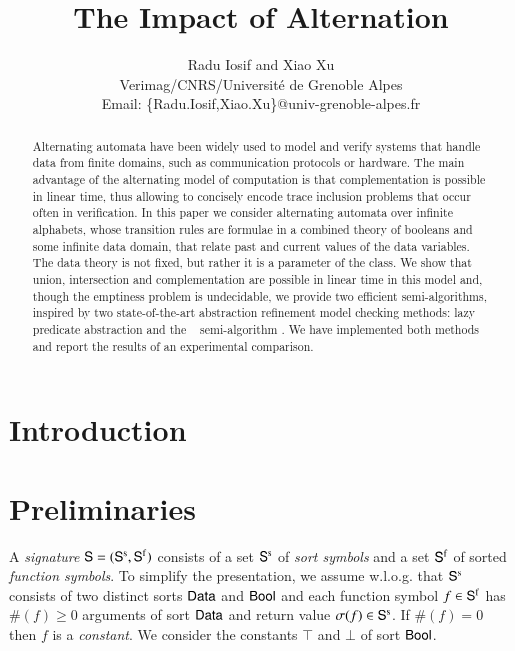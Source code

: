 \documentclass[10pt,conference,letterpaper,twocolumn]{IEEEtran}
\begin{document}

\title{The Impact of Alternation}

\author{Radu Iosif and Xiao Xu \\
Verimag/CNRS/Universit\'e de Grenoble Alpes\\
Email: \{Radu.Iosif,Xiao.Xu\}@univ-grenoble-alpes.fr}

\maketitle

\begin{abstract}
Alternating automata have been widely used to model and verify systems
that handle data from finite domains, such as communication protocols
or hardware. The main advantage of the alternating model of
computation is that complementation is possible in linear time, thus
allowing to concisely encode trace inclusion problems that occur often
in verification. In this paper we consider alternating automata over
infinite alphabets, whose transition rules are formulae in a combined
theory of booleans and some infinite data domain, that relate past and
current values of the data variables. The data theory is not fixed,
but rather it is a parameter of the class. We show that union,
intersection and complementation are possible in linear time in this
model and, though the emptiness problem is undecidable, we provide two
efficient semi-algorithms, inspired by two state-of-the-art
abstraction refinement model checking methods: lazy predicate
abstraction \cite{HJMS02} and the \impact~ semi-algorithm
\cite{mcmillan06}. We have implemented both methods and report the
results of an experimental comparison.
\end{abstract}

\section{Introduction}

\section{Preliminaries}

A \emph{signature} $\mathsf{S} = (\mathsf{S}^\mathrm{s},\mathsf{S}^\mathrm{f})$ consists of a
set $\mathsf{S}^\mathrm{s}$ of \emph{sort symbols} and a set $\mathsf{S}^\mathrm{f}$ of
sorted \emph{function symbols}. To simplify the presentation, we
assume w.l.o.g. that $\mathsf{S}^\mathrm{s}$ consists of two distinct sorts
$\mathsf{Data}$ and $\mathsf{Bool}$ and each function symbol $f \in \mathsf{S}^\mathrm{f}$ has
$\#(f) \geq 0$ arguments of sort $\mathsf{Data}$ and return value $\sigma(f)
\in \mathsf{S}^\mathrm{s}$. If $\#(f)=0$ then $f$ is a \emph{constant}. We
consider the constants $\top$ and $\bot$ of sort $\mathsf{Bool}$.
\end{document}
